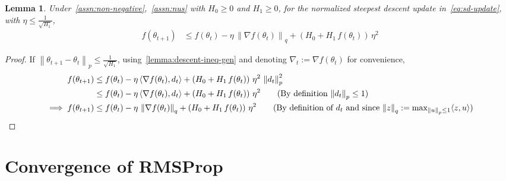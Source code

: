 \documentclass{article}
\newtheorem{lemma}{Lemma}
\newcommand{\normsq}[1]{\left\|#1 \right\|^{2}}
\newcommand{\norm}[1]{\left\|#1 \right\|}
\newcommand{\tht}{\theta_t}
\newcommand{\thtt}{\theta_{t+1}}
\begin{document}
\begin{lemma}
Under~\cref{assn:non-negative},~\cref{assn:nus} with $H_0 \geq 0$ and $H_1 \geq 0$, for the normalized steepest descent update in~\cref{eq:sd-update}, with $\eta \leq \frac{1}{\sqrt{H_1}}$, 
\begin{align*}
f(\thtt) & \leq f(\tht) - \eta \, \norm{\nabla f(\tht)}_{q} +  \left(H_0 + H_1 \, f(\tht) \right) \, \eta^2
\end{align*}   
\label{lemma:sd-descent}
\end{lemma}
\begin{proof}
If $\norm{\thtt - \tht}_p \leq \frac{1}{\sqrt{H_1}}$, using~\cref{lemma:descent-ineq-gen} and denoting $\nabla_t := \nabla f(\tht)$ for convenience,
\begin{align*}
f(\thtt) & \leq f(\tht) - \eta \,  \langle \nabla f(\tht), d_t \rangle + \left(H_0 + H_1 \, f(\tht) \right) \, \eta^2 \, \normsq{d_t}_{p} \\
& \leq f(\tht) - \eta \,  \langle \nabla f(\tht), d_t \rangle + \left(H_0 + H_1 \, f(\tht) \right) \, \eta^2  \tag{By definition $\norm{d_t}_p \leq 1$} \\
\implies f(\thtt) & \leq f(\tht) - \eta \,  \norm{\nabla f(\tht)}_{q} +\left(H_0 + H_1 \, f(\tht) \right) \, \eta^2  \tag{By definition of $d_t$ and since $\norm{z}_q := \max_{\norm{u}_p \leq 1} \langle z, u \rangle$} 
\end{align*}

\end{proof}
\section{Convergence of RMSProp}
\label{app:rms}
\rms*
\end{document}
